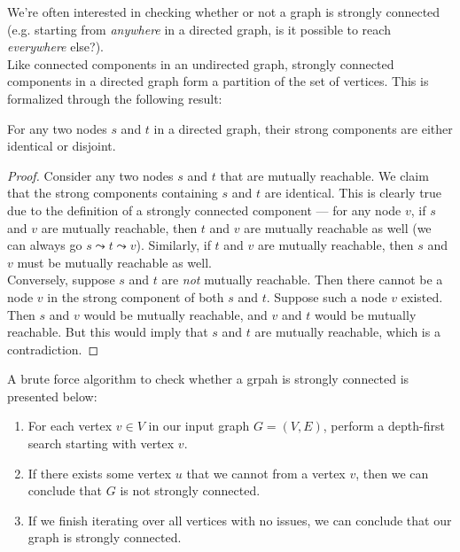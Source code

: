 We're often interested in checking whether or not a graph is strongly connected (e.g. starting from \textit{anywhere} in a directed graph, is it possible to reach \textit{everywhere} else?).  \\



Like connected components in an undirected graph, strongly connected components in a directed graph form a partition of the set of vertices. This is formalized through the following result:

\begin{lemma}
For any two nodes $s$ and $t$ in a directed graph, their strong components are either identical or disjoint.
\end{lemma}

\begin{proof}
Consider any two nodes $s$ and $t$ that are mutually reachable. We claim that the strong components containing $s$ and $t$ are identical. This is clearly true due to the definition of a strongly connected component --- for any node $v$, if $s$ and $v$ are mutually reachable, then $t$ and $v$ are mutually reachable as well (we can always go $s\leadsto t \leadsto v$). Similarly, if $t$ and $v$ are mutually reachable, then $s$ and $v$ must be mutually reachable as well. \\

Conversely, suppose $s$ and $t$ are \textit{not} mutually reachable. Then there cannot be a node $v$ in the strong component of both $s$ and $t$. Suppose such a node $v$ existed. Then $s$ and $v$ would be mutually reachable, and $v$ and $t$ would be mutually reachable. But this would imply that $s$ and $t$ are mutually reachable, which is a contradiction.
\end{proof}

A brute force algorithm to check whether a grpah is strongly connected is presented below:

\begin{enumerate}
    \item For each vertex $v \in V$ in our input graph $G = (V, E)$, perform a depth-first search starting with vertex $v$.
    \item If there exists some vertex $u$ that we cannot from a vertex $v$, then we can conclude that $G$ is not strongly connected. 
    \item If we finish iterating over all vertices with no issues, we can conclude that our graph is strongly connected.
\end{enumerate}

